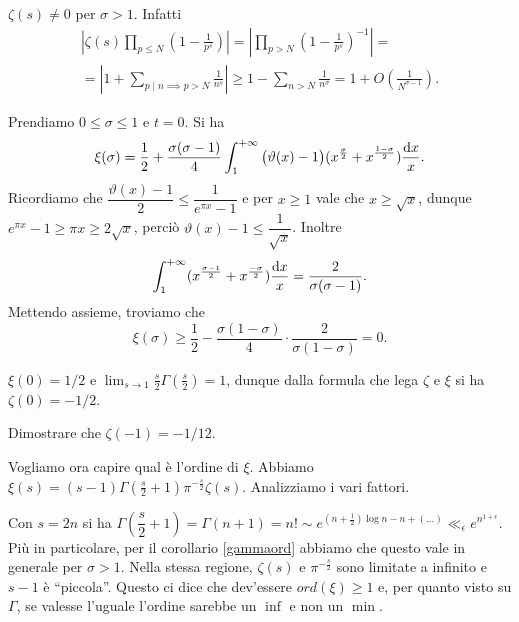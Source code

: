 \begin{oss}
  $\zeta(s)\not=0$ per $\sigma>1$. Infatti
  \begin{gather*}
    \left|\zeta(s)\prod_{p \le N} \left(1-\frac{1}{p^s}\right)\right|=\left|\prod_{p>N} \left(1-\frac{1}{p^s}\right)^{-1}\right|= \\
    =\left|1+\sum_{p \mid n \implies p>N} \frac{1}{n^s}\right| \ge 1-\sum_{n>N} \frac{1}{n^{\sigma}}=1+O\left(\frac{1}{N^{\sigma-1}}\right).
  \end{gather*}
\end{oss}

\begin{oss}
  Prendiamo $0 \le \sigma \le 1$ e $t=0$. Si ha
  $$\xi(\sigma)=\frac{1}{2}+\frac{\sigma(\sigma-1)}{4}\int_1^{+\infty}\big(\vartheta(x)-1\big)(x^{\frac{\sigma}{2}}+x^{\frac{1-\sigma}{2}})\frac{\mathop{}\!\mathrm{d} x}{x}.$$
  Ricordiamo che $\dfrac{\vartheta(x)-1}{2} \le \dfrac{1}{e^{\pi x}-1}$ e per $x \ge 1$ vale che $x \ge \sqrt{x}$, dunque $e^{\pi x}-1 \ge \pi x \ge 2\sqrt{x}$, perciò $\vartheta(x)-1 \le \dfrac{1}{\sqrt{x}}$. Inoltre
  $$\int_1^{+\infty} (x^{\frac{\sigma-1}{2}}+x^{\frac{-\sigma}{2}})\frac{\mathop{}\!\mathrm{d} x}{x}=\frac{2}{\sigma(\sigma-1)}.$$
  Mettendo assieme, troviamo che
  $$\xi(\sigma) \ge \frac{1}{2}-\frac{\sigma(1-\sigma)}{4}\cdot\frac{2}{\sigma(1-\sigma)}=0.$$
\end{oss}

\begin{oss}
  $\xi(0)=1/2$ e $\displaystyle \lim_{s \longrightarrow 1} \frac{s}{2}\Gamma\left(\frac{s}{2}\right)=1$, dunque dalla formula che lega $\zeta$ e $\xi$ si ha $\zeta(0)=-1/2$.
\end{oss}

\begin{exc}
  Dimostrare che $\zeta(-1)=-1/12$.
\end{exc}

Vogliamo ora capire qual è l'ordine di $\xi$. Abbiamo $\xi(s)=(s-1)\Gamma\left(\frac{s}{2}+1\right)\pi^{-\frac{s}{2}}\zeta(s)$. Analizziamo i vari fattori.

Con $s=2n$ si ha $\Gamma\left(\dfrac{s}{2}+1\right)=\Gamma(n+1)=n!\sim e^{\left(n+\frac{1}{2}\right)\log{n}-n+(\dots)} \ll_{\epsilon} e^{n^{1+\epsilon}}$. Più in particolare, per il corollario \ref{gammaord} abbiamo che questo vale in generale per $\sigma>1$.
Nella stessa regione, $\zeta(s)$ e $\pi^{-\frac{s}{2}}$ sono limitate a infinito e $s-1$ è ``piccola''. Questo ci dice che dev'essere $ord(\xi) \ge 1$ e, per quanto visto su $\Gamma$, se valesse l'uguale l'ordine sarebbe un $\inf$ e non un $\min$.

